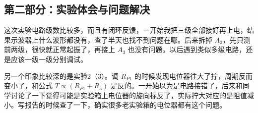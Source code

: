 ﻿\documentclass[10.5pt]{config}
\begin{document}
\subsection*{第二部分：实验体会与问题解决}

这次实验电路级数比较多，而且有闭环反馈，一开始我把三级全部接好再上电，结果示波器上什么波形都没有，查了半天也找不到问题在哪。后来拆掉 $A_3$，先只测前两级，很快就正常起振了，再接上 $A_3$ 也没有问题。以后遇到类似多级电路，还是应该一级一级分别调试。

另一个印象比较深的是实验2（3）。调 $R_{P1}$ 的时候发现电位器往大了拧，周期反而变小了，和公式 $T \propto (R_{P1}+R_5)$ 是反的。一开始以为是电路接错了，后来和同学讨论了一下觉得可能是实验箱上电位器的旋向标反了，实际拧大对应的是阻值减小。写报告的时候查了一下，确实很多老实验箱的电位器都有这个问题。
\end{document}
